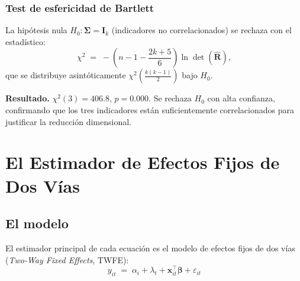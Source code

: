 \documentclass[12pt, a4paper]{article}
\theoremstyle{definition}
\begin{document}
\subsubsection{Test de esfericidad de Bartlett}

La hipótesis nula $H_0: \bm{\Sigma} = \bm{I}_k$ (indicadores no correlacionados) se rechaza con el estadístico:
\[
  \chi^2 \;=\; -\!\left(n - 1 - \frac{2k+5}{6}\right)\ln\!\det(\hat{\bm{R}}),
\]
que se distribuye asintóticamente $\chi^2\!\left(\frac{k(k-1)}{2}\right)$ bajo $H_0$.

\begin{resultbox}
\textbf{Resultado.} $\chi^2(3) = 406.8$, $p = 0.000$. Se rechaza $H_0$ con alta confianza, confirmando que los tres indicadores están suficientemente correlacionados para justificar la reducción dimensional.
\end{resultbox}

\section{El Estimador de Efectos Fijos de Dos Vías}
\label{sec:twfe}

\subsection{El modelo}

El estimador principal de cada ecuación es el modelo de efectos fijos de dos vías (\textit{Two-Way Fixed Effects}, TWFE):
\[
  \boxed{y_{it} \;=\; \alpha_i + \lambda_t + \bm{x}_{it}^\top \bm{\beta} + \varepsilon_{it}}
\]
\end{document}
